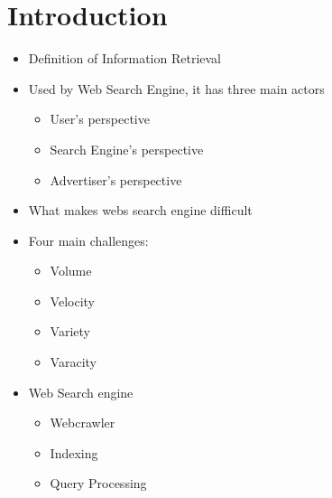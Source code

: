 \chapter{Introduction}
\begin{itemize}
    \item Definition of Information Retrieval
    \item Used by Web Search Engine, it has three main actors
    \begin{itemize}
        \item User’s perspective
        \item Search Engine’s perspective
        \item Advertiser’s perspective
    \end{itemize}
    \item What makes webs search engine difficult
    \item Four main challenges:
    \begin{itemize}
        \item Volume
        \item Velocity
        \item Variety
        \item Varacity
    \end{itemize}
    \item Web Search engine
    \begin{itemize}
        \item Webcrawler
        \item Indexing
        \item Query Processing
    \end{itemize}
\end{itemize}

